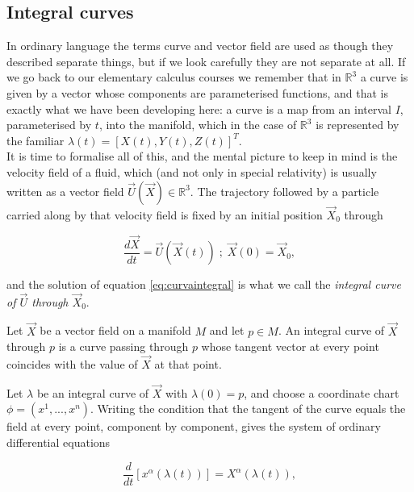     \subsection{Integral curves}

        In ordinary language the terms curve and vector field are used as though they described separate things, but if we look carefully they are not separate at all. If we go back to our elementary calculus courses we remember that in $\mathbb{R}^3$ a curve is given by a vector whose components are parameterised functions, and that is exactly what we have been developing here: a curve is a map from an interval $I$, parameterised by $t$, into the manifold, which in the case of $\mathbb{R}^3$ is represented by the familiar $\lambda(t) = [X(t),Y(t),Z(t)]^T$.\\

        It is time to formalise all of this, and the mental picture to keep in mind is the velocity field of a fluid, which (and not only in special relativity) is usually written as a vector field $\Vec{U}(\Vec{X}) \in \mathbb{R}^3$. The trajectory followed by a particle carried along by that velocity field is fixed by an initial position $\Vec{X}_0$ through

        \begin{equation}\label{eq:curvaintegral}
            \frac{d \Vec{X}}{dt} = \Vec{U}\left(\Vec{X}(t)\right)\;;\;\Vec{X}(0) = \Vec{X}_0,
        \end{equation}

        and the solution of equation \ref{eq:curvaintegral} is what we call the \textit{integral curve of $\Vec{U}$ through $\Vec{X}_0$}.

        \begin{myDef}
            Let $\Vec{X}$ be a vector field on a manifold $M$ and let $p \in M$. An integral curve of $\Vec{X}$ through $p$ is a curve passing through $p$ whose tangent vector at every point coincides with the value of $\Vec{X}$ at that point.
        \end{myDef}

        Let $\lambda$ be an integral curve of $\Vec{X}$ with $\lambda(0) = p$, and choose a coordinate chart $\phi = (x^1,...,x^n)$. Writing the condition that the tangent of the curve equals the field at every point, component by component, gives the system of ordinary differential equations

        \begin{equation}\label{eq:IntegralCurveODE}
            \frac{d}{dt}\left[x^{\alpha}(\lambda(t))\right] = X^{\alpha}\left(\lambda(t)\right),
        \end{equation}


